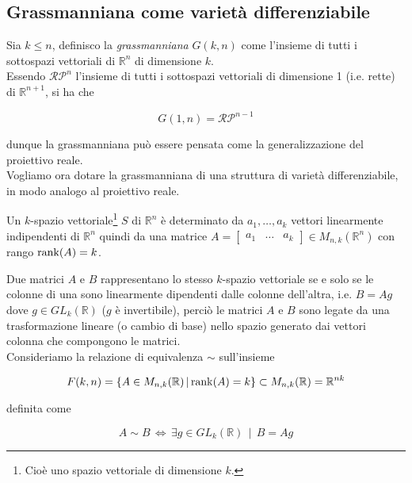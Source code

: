 \subsection{Grassmanniana come varietà differenziabile}

Sia $ k \leqslant n $, definisco la \textit{grassmanniana} $ G(k,n) $ come l'insieme di tutti i sottospazi vettoriali di $ \mathbb{R}^{n} $ di dimensione $ k $.\\
Essendo $ \mathcal{RP}^{n} $ l'insieme di tutti i sottospazi vettoriali di dimensione 1 (i.e. rette) di $ \mathbb{R}^{n+1} $, si ha che

\begin{equation}
	G(1,n) = \mathcal{RP}^{n-1}
\end{equation}

dunque la grassmanniana può essere pensata come la generalizzazione del proiettivo reale.\\
Vogliamo ora dotare la grassmanniana di una struttura di varietà differenziabile, in modo analogo al proiettivo reale.

\begin{remark}
	Un $ k $-spazio vettoriale\footnote{%
		Cioè uno spazio vettoriale di dimensione $ k $.%
	} $ S $ di $ \mathbb{R}^{n} $ è determinato da $ a_{1},\dots,a_{k} $ vettori linearmente indipendenti di $ \mathbb{R}^{n} $ quindi da una matrice $ A = \begin{bmatrix} a_{1} & \dots & a_{k} \end{bmatrix} \in M_{n,k}(\mathbb{R}^{n}) $ con rango $ \rank(A) = k $.
\end{remark}

Due matrici $ A $ e $ B $ rappresentano lo stesso $ k $-spazio vettoriale se e solo se le colonne di una sono linearmente dipendenti dalle colonne dell'altra, i.e. $ B = A g $ dove $ g \in GL_{k}(\mathbb{R}) $ ($ g $ è invertibile), perciò le matrici $ A $ e $ B $ sono legate da una trasformazione lineare (o cambio di base) nello spazio generato dai vettori colonna che compongono le matrici.\\
Consideriamo la relazione di equivalenza $ \sim $ sull'insieme

\begin{equation}
	F(k,n) = \left\{ A \in M_{n,k}(\mathbb{R}) \, \middle| \, \rank(A) = k \right\} \subset M_{n,k}(\mathbb{R}) = \mathbb{R}^{nk}
\end{equation}

definita come

\begin{equation}
	A \sim B \, \iff \, \exists g \in GL_{k}(\mathbb{R}) \, \mid \, B = A g
\end{equation}

